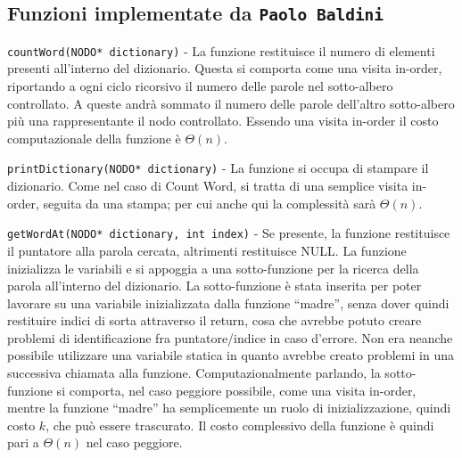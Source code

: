\documentclass[paper=a4, fontsize=11pt,twoside]{scrartcl}   %
\begin{document}
			\subsection{Funzioni implementate da \texttt{Paolo Baldini}}
				\texttt{countWord(NODO* dictionary)} - La funzione restituisce il numero di elementi presenti all’interno del dizionario. Questa si comporta come una visita in-order, riportando a ogni ciclo ricorsivo il numero delle parole nel sotto-albero controllato. A queste andrà sommato il numero delle parole dell’altro sotto-albero più una rappresentante il nodo controllato. Essendo una visita in-order il costo computazionale della funzione è $\Theta(n)$.\par
				
				\texttt{printDictionary(NODO* dictionary)} - La funzione si occupa di stampare il dizionario. Come nel caso di Count Word, si tratta di una semplice visita in-order, seguita da una stampa; per cui anche qui la complessità sarà $\Theta(n)$.\par
				
				\texttt{getWordAt(NODO* dictionary, int index)} - Se presente, la funzione restituisce il puntatore alla parola cercata, altrimenti restituisce NULL. La funzione inizializza le variabili e si appoggia a una sotto-funzione per la ricerca della parola all’interno del dizionario. La sotto-funzione è stata inserita per poter lavorare su una variabile inizializzata dalla funzione “madre”, senza dover quindi restituire indici di sorta attraverso il return, cosa che avrebbe potuto creare problemi di identificazione fra puntatore/indice in caso d’errore. Non era neanche possibile utilizzare una variabile statica in quanto avrebbe creato problemi in una successiva chiamata alla funzione. Computazionalmente parlando, la sotto-funzione si comporta, nel caso peggiore possibile, come una visita in-order, mentre la funzione “madre” ha semplicemente un ruolo di inizializzazione, quindi costo $k$, che può essere trascurato. Il costo complessivo della funzione è quindi pari a $\Theta(n)$ nel caso peggiore.\par
				
\end{document}
